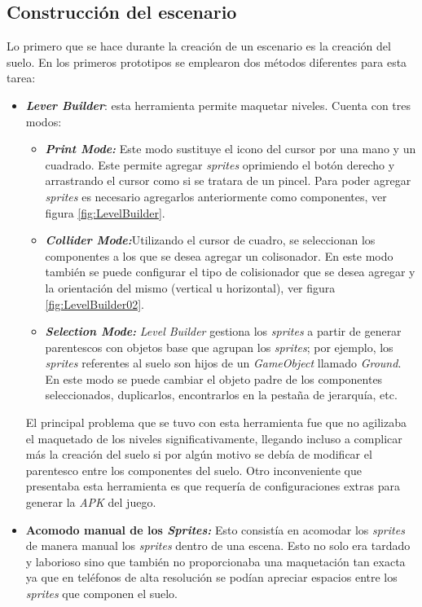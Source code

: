 \subsection{Construcción del escenario} \label{ConstruccionNivel}
Lo primero que se hace durante la creación de un escenario es la creación del 
suelo. En los primeros prototipos se emplearon dos métodos diferentes para esta 
tarea:  
	\begin{itemize}
		\item \textbf{\textit{Lever Builder}}: esta herramienta permite maquetar 
		niveles. Cuenta con tres modos: 
		\begin{itemize}
			\item \textbf{\textit{Print Mode:}} Este modo sustituye el icono del 
			cursor por una mano y un cuadrado. Este permite agregar 
			\textit{sprites} oprimiendo el botón derecho y arrastrando el cursor 
			como si se tratara de un pincel. Para poder agregar \textit{sprites} 
			es necesario agregarlos anteriormente como componentes, ver figura 
			\ref{fig:LevelBuilder}.
			\item \textbf{\textit{Collider Mode:}}Utilizando el cursor de 
			cuadro, se seleccionan los componentes a los que se desea agregar un 
			colisonador. En este modo también se puede configurar el tipo de 
			colisionador que se desea agregar y la orientación del mismo 
			(vertical u horizontal), ver figura \ref{fig:LevelBuilder02}.
			\item \textbf{\textit{Selection Mode:}} \textit{Level Builder} 
			gestiona los \textit{sprites} a partir de generar parentescos con 
			objetos base que agrupan los \textit{sprites}; por ejemplo, los 
			\textit{sprites} referentes al suelo son hijos de un 
			\textit{GameObject} llamado \textit{Ground}. En este modo se puede 
			cambiar el objeto padre de los componentes seleccionados, 
			duplicarlos, encontrarlos en la pestaña de jerarquía, etc.  
		\end{itemize} 
		
		El principal problema que se tuvo con esta herramienta fue que no 
		agilizaba el maquetado de los niveles significativamente, llegando 
		incluso a complicar más la creación del suelo si por algún motivo se 
		debía de modificar el parentesco entre los componentes del suelo. Otro 
		inconveniente que presentaba esta herramienta es que requería de 
		configuraciones extras para generar la \textit{APK} del juego.
		
		\item \textbf{Acomodo manual de los \textit{Sprites:}} Esto consistía en 
		acomodar los \textit{sprites} de manera manual los \textit{sprites} 
		dentro de una escena. Esto no solo era tardado y laborioso sino que 
		también no proporcionaba una maquetación tan exacta ya que en teléfonos 
		de alta resolución se podían apreciar espacios entre los 
		\textit{sprites} que componen el suelo.
	\end{itemize}

